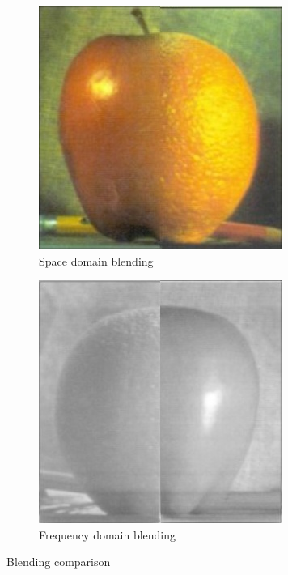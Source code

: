 \begin{figure}[h!]
\centering
\begin{subfigure}{0.5\textwidth}
  \centering
  \includegraphics[width=0.9\linewidth]{output/blending1.jpg}
  \caption{Space domain blending}
\end{subfigure}%
\begin{subfigure}{0.5\textwidth}
  \centering
  \includegraphics[width=0.9\linewidth]{output/left_right1.jpg}
  \caption{Frequency domain blending}
\end{subfigure}%
\caption{Blending comparison}
\label{fig:comparison-blending}
\end{figure}


